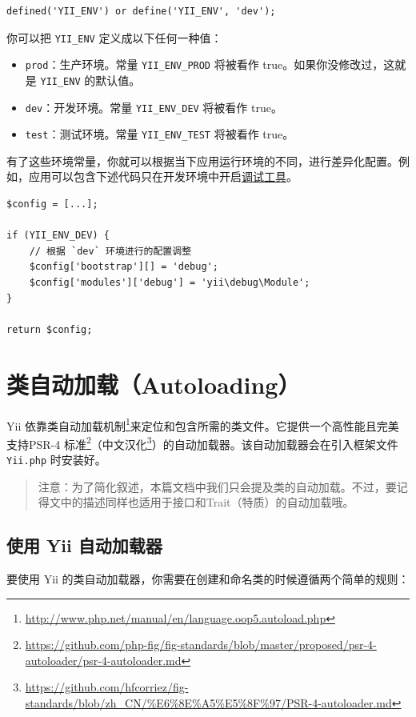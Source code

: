 \lstset{language=php}\begin{lstlisting}
defined('YII_ENV') or define('YII_ENV', 'dev');
\end{lstlisting}
你可以把 \lstinline|YII_ENV| 定义成以下任何一种值：

\begin{itemize}
\item \lstinline|prod|：生产环境。常量 \lstinline|YII_ENV_PROD| 将被看作 true。如果你没修改过，这就是 \lstinline|YII_ENV| 的默认值。
\item \lstinline|dev|：开发环境。常量 \lstinline|YII_ENV_DEV| 将被看作 true。
\item \lstinline|test|：测试环境。常量 \lstinline|YII_ENV_TEST| 将被看作 true。
\end{itemize}
有了这些环境常量，你就可以根据当下应用运行环境的不同，进行差异化配置。例如，应用可以包含下述代码只在开发环境中开启\hyperref[tool-debugger.md]{调试工具}。

\lstset{language=php}\begin{lstlisting}
$config = [...];

if (YII_ENV_DEV) {
    // 根据 `dev` 环境进行的配置调整
    $config['bootstrap'][] = 'debug';
    $config['modules']['debug'] = 'yii\debug\Module';
}

return $config;
\end{lstlisting}


\label{concept-autoloading.md}\section{类自动加载（Autoloading）}
Yii 依靠类自动加载机制\footnote{\url{http://www.php.net/manual/en/language.oop5.autoload.php}}来定位和包含所需的类文件。它提供一个高性能且完美支持PSR-4 标准\footnote{\url{https://github.com/php-fig/fig-standards/blob/master/proposed/psr-4-autoloader/psr-4-autoloader.md}}（中文汉化\footnote{\url{https://github.com/hfcorriez/fig-standards/blob/zh\_CN/\%E6\%8E\%A5\%E5\%8F\%97/PSR-4-autoloader.md}}）的自动加载器。该自动加载器会在引入框架文件 \lstinline|Yii.php| 时安装好。

\begin{quote}注意：为了简化叙述，本篇文档中我们只会提及类的自动加载。不过，要记得文中的描述同样也适用于接口和Trait（特质）的自动加载哦。

\end{quote}
\subsection{使用 Yii 自动加载器 \label{concept-autoloading.md::using-yii-autoloader}}
要使用 Yii  的类自动加载器，你需要在创建和命名类的时候遵循两个简单的规则：

